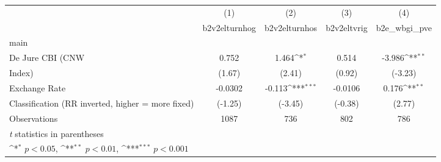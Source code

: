 {
\def\sym#1{\ifmmode^{#1}\else\(^{#1}\)\fi}
\begin{tabular}{l*{4}{c}}
\hline\hline
                    &\multicolumn{1}{c}{(1)}&\multicolumn{1}{c}{(2)}&\multicolumn{1}{c}{(3)}&\multicolumn{1}{c}{(4)}\\
                    &\multicolumn{1}{c}{b2v2elturnhog}&\multicolumn{1}{c}{b2v2elturnhos}&\multicolumn{1}{c}{b2v2eltvrig}&\multicolumn{1}{c}{b2e\_wbgi\_pve}\\
\hline
main                &                     &                     &                     &                     \\
De Jure CBI (CNW    &       0.752         &       1.464\sym{*}  &       0.514         &      -3.986\sym{**} \\
Index)              &      (1.67)         &      (2.41)         &      (0.92)         &     (-3.23)         \\
[1em]
Exchange Rate       &     -0.0302         &      -0.113\sym{***}&     -0.0106         &       0.176\sym{**} \\
Classification (RR inverted, higher = more fixed)&     (-1.25)         &     (-3.45)         &     (-0.38)         &      (2.77)         \\
\hline
Observations        &        1087         &         736         &         802         &         786         \\
\hline\hline
\multicolumn{5}{l}{\footnotesize \textit{t} statistics in parentheses}\\
\multicolumn{5}{l}{\footnotesize \sym{*} \(p<0.05\), \sym{**} \(p<0.01\), \sym{***} \(p<0.001\)}\\
\end{tabular}
}
